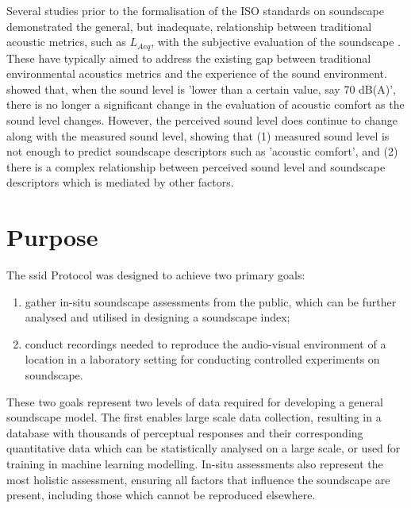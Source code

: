 Several studies prior to the formalisation of the ISO standards on soundscape demonstrated the general, but inadequate, relationship between traditional acoustic metrics, such as $L_{Aeq}$, with the subjective evaluation of the soundscape . These have typically aimed to address the existing gap between traditional environmental acoustics metrics and the experience of the sound environment. \citep{Yang2005Acoustic} showed that, when the sound level is 'lower than a certain value, say 70 dB(A)', there is no longer a significant change in the evaluation of acoustic comfort as the sound level changes. However, the perceived sound level does continue to change along with the measured sound level, showing that (1) measured sound level is not enough to predict soundscape descriptors such as 'acoustic comfort', and (2) there is a complex relationship between perceived sound level and soundscape descriptors which is mediated by other factors.


\section{Purpose}

 The \gls{ssid} Protocol was designed to achieve two primary goals:
 \begin{enumerate}
   \item gather in-situ soundscape assessments from the public, which can be further analysed and utilised in designing a soundscape index;
   \item conduct recordings needed to reproduce the audio-visual environment of a location in a laboratory setting for conducting controlled experiments on soundscape.
 \end{enumerate}

 These two goals represent two levels of data required for developing a general soundscape model. The first enables large scale data collection, resulting in a database with thousands of perceptual responses and their corresponding quantitative data which can be statistically analysed on a large scale, or used for training in machine learning modelling. In-situ assessments also represent the most holistic assessment, ensuring all factors that influence the soundscape are present, including those which cannot be reproduced elsewhere.

